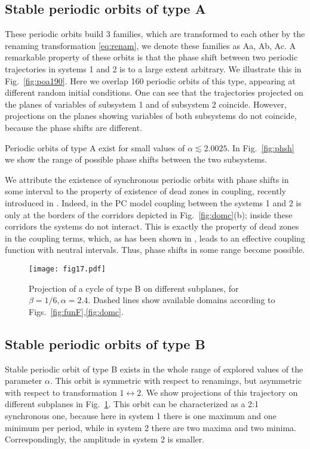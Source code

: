 \documentclass[3p,number,review,sort&compress]{elsarticle}
\begin{document}
\subsection{Stable periodic orbits of type A}
These periodic orbits build 3 families, which are transformed to each other
by the renaming transformation \eqref{eq:renam}, we denote these families as Aa, Ab, Ac. A remarkable property of these orbits is that the phase shift between two
periodic trajectories in systems 1 and 2 is to a large extent arbitrary. We illustrate this in Fig.~\ref{fig:poa190}. Here we overlap  160 periodic orbits of this type, appearing at different random initial conditions. One can see
that the trajectories projected on the planes of variables of subsystem 1 and of subsystem 2 coincide. However, projections on the planes showing variables of both subsystems do not coincide, because the phase shifts are different.

Periodic orbits of type A exist for small values of $\alpha\lesssim 2.0025$. In Fig.~\ref{fig:phsh} we show the range of possible phase shifts between the two subsystems.  

We attribute the existence of synchronous periodic orbits 
with phase shifts in some interval
to the property of existence of dead zones in coupling, recently
introduced in \cite{ashwin2019state,ashwin2021dead}. Indeed, in the PC model
coupling between the systems 1 and 2 is only at the borders of the corridors depicted in Fig.~\ref{fig:domc}(b); inside these corridors the systems do not interact. This is exactly the property of dead zones in the coupling terms, which, as has been shown in \cite{ashwin2019state,ashwin2021dead}, leads to an effective coupling function with
neutral intervals. Thus, phase shifts in some range become possible.


\begin{figure}[!htb]
\centering
\texttt{[image: fig17.pdf]}
\caption{Projection of a cycle of type B on different subplanes, for  $\beta=1/6,\alpha=2.4$. Dashed lines show available domains according to Figs.~\ref{fig:funF},\ref{fig:domc}.}
\label{fig:trB}
\end{figure}

\subsection{Stable periodic orbits of type B}
Stable periodic orbit of type B exists in the whole range of explored values of the parameter $\alpha$. This orbit is symmetric with respect to renamings, 
but asymmetric with respect to transformation $1\leftrightarrow 2$. 
We show projections of this trajectory on different subplanes
in Fig.~\ref{fig:trB}. This orbit can be characterized as a 2:1 synchronous one,
because here in system 1 there is one maximum and one minimum per period, while in system 2 there are two maxima and two minima. Correspondingly, the amplitude
in system 2 is smaller.
\end{document}

